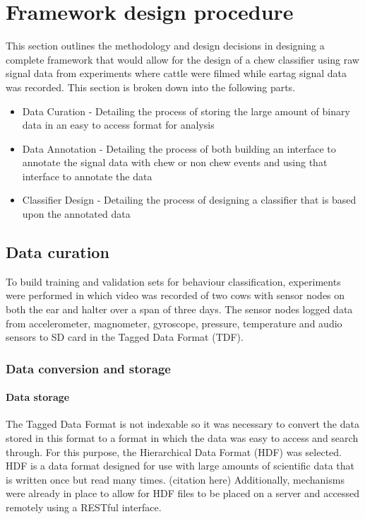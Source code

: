 \chapter{Framework design procedure}

This section outlines the methodology and design decisions in designing a complete framework that would allow for the design of a chew classifier using raw signal data from experiments where cattle were filmed while eartag signal data was recorded. This section is broken down into the following parts.

\begin{itemize}
\item Data Curation - Detailing the process of storing the large amount of binary data in an easy to access format for analysis

\item Data Annotation - Detailing the process of both building an interface to annotate the signal data with chew or non chew events and using that interface to annotate the data

\item Classifier Design - Detailing the process of designing a classifier that is based upon the annotated data
\end{itemize}

\section{Data curation}

To build training and validation sets for behaviour classification, experiments were performed in which video was recorded of two cows with sensor nodes on both the ear and halter over a span of three days. The sensor nodes logged data from accelerometer, magnometer, gyroscope, pressure, temperature and audio sensors to SD card in the Tagged Data Format (TDF). 

\subsection{Data conversion and storage}

\subsubsection{Data storage}
\label{Data storage}
The Tagged Data Format is not indexable so it was necessary to convert the data stored in this format to a format in which the data was easy to access and search through. For this purpose, the Hierarchical Data Format (HDF) was selected. HDF is a data format designed for use with large amounts of scientific data that is written once but read many times. (citation here) Additionally, mechanisms were already in place to allow for HDF files to be placed on a server and accessed remotely using a RESTful interface. 

